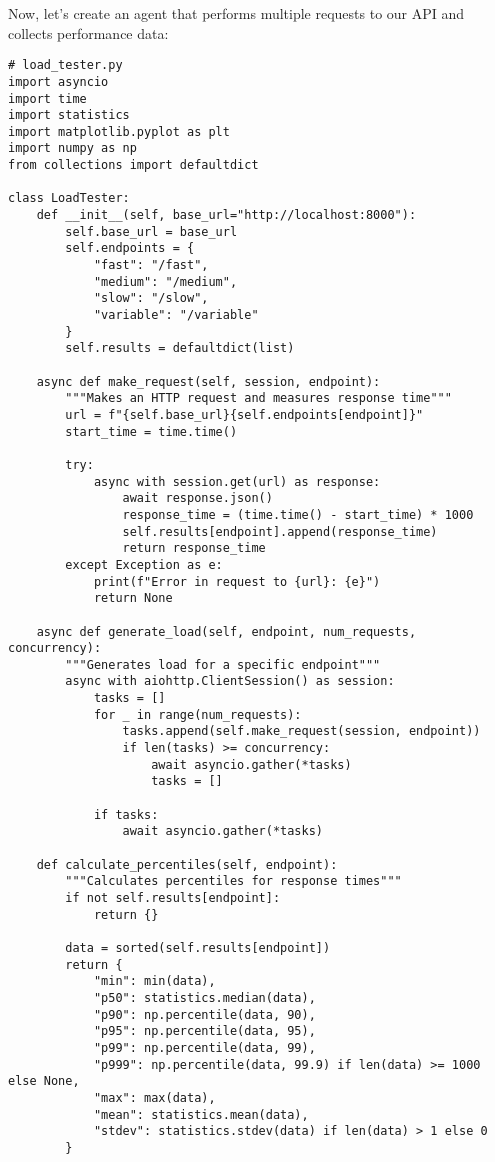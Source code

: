 \documentclass[12pt,letterpaper]{article}
\newenvironment{macterminal}{%
    \begin{mdframed}[
        linecolor=terminalFrame,
        backgroundcolor=terminalBg,
        roundcorner=5pt,
        skipabove=10pt,
        skipbelow=10pt,
        linewidth=1pt,
        innertopmargin=10pt, %
        frametitle={%
            \tikz[baseline=(current bounding box.east), outer sep=0pt]{
                \fill[red!80!black] (0,0) circle (5pt);
                \fill[yellow!80!black] (0.7,0) circle (5pt);
                \fill[green!70!black] (1.4,0) circle (5pt);
            }
        },
        frametitlealignment=\raggedright, %
        frametitleaboveskip=8pt, %
        frametitlebelowskip=0pt, %
    ]
}{%
    \end{mdframed}%
}
\begin{document}
Now, let's create an agent that performs multiple requests to our API and collects performance data:

\begin{macterminal}
\begin{lstlisting}
# load_tester.py
import asyncio
import time
import statistics
import matplotlib.pyplot as plt
import numpy as np
from collections import defaultdict

class LoadTester:
    def __init__(self, base_url="http://localhost:8000"):
        self.base_url = base_url
        self.endpoints = {
            "fast": "/fast",
            "medium": "/medium",
            "slow": "/slow",
            "variable": "/variable"
        }
        self.results = defaultdict(list)
    
    async def make_request(self, session, endpoint):
        """Makes an HTTP request and measures response time"""
        url = f"{self.base_url}{self.endpoints[endpoint]}"
        start_time = time.time()
        
        try:
            async with session.get(url) as response:
                await response.json()
                response_time = (time.time() - start_time) * 1000
                self.results[endpoint].append(response_time)
                return response_time
        except Exception as e:
            print(f"Error in request to {url}: {e}")
            return None
    
    async def generate_load(self, endpoint, num_requests, concurrency):
        """Generates load for a specific endpoint"""
        async with aiohttp.ClientSession() as session:
            tasks = []
            for _ in range(num_requests):
                tasks.append(self.make_request(session, endpoint))
                if len(tasks) >= concurrency:
                    await asyncio.gather(*tasks)
                    tasks = []
            
            if tasks:
                await asyncio.gather(*tasks)
    
    def calculate_percentiles(self, endpoint):
        """Calculates percentiles for response times"""
        if not self.results[endpoint]:
            return {}
        
        data = sorted(self.results[endpoint])
        return {
            "min": min(data),
            "p50": statistics.median(data),
            "p90": np.percentile(data, 90),
            "p95": np.percentile(data, 95),
            "p99": np.percentile(data, 99),
            "p999": np.percentile(data, 99.9) if len(data) >= 1000 else None,
            "max": max(data),
            "mean": statistics.mean(data),
            "stdev": statistics.stdev(data) if len(data) > 1 else 0
        }
    

\end{lstlisting}
\end{macterminal}
\end{document}
